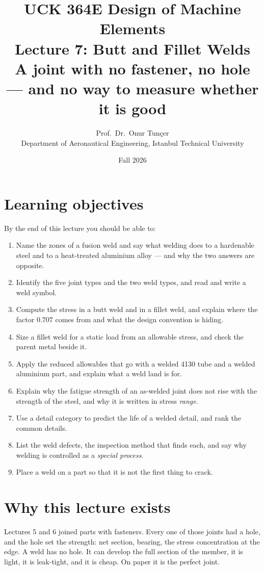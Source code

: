 \documentclass[11pt,a4paper]{article}
\title{\textbf{UCK 364E Design of Machine Elements}\\[4pt]
\Large Lecture 7: Butt and Fillet Welds\\[2pt]
\large A joint with no fastener, no hole --- and no way to measure whether it is good}
\author{Prof.\ Dr.\ Onur Tunçer\\ Department of Aeronautical Engineering, Istanbul Technical University}
\date{Fall 2026}
\begin{document}
\maketitle

\section*{Learning objectives}
By the end of this lecture you should be able to:
\begin{enumerate}[nosep]
  \item Name the zones of a fusion weld and say what welding does to a hardenable steel and to a
        heat-treated aluminium alloy --- and why the two answers are opposite.
  \item Identify the five joint types and the two weld types, and read and write a weld symbol.
  \item Compute the stress in a butt weld and in a fillet weld, and explain where the factor
        $0.707$ comes from and what the design convention is hiding.
  \item Size a fillet weld for a static load from an allowable stress, and check the parent metal
        beside it.
  \item Apply the reduced allowables that go with a welded 4130 tube and a welded aluminium part,
        and explain what a weld land is for.
  \item Explain why the fatigue strength of an as-welded joint does not rise with the strength of
        the steel, and why it is written in stress \emph{range}.
  \item Use a detail category to predict the life of a welded detail, and rank the common details.
  \item List the weld defects, the inspection method that finds each, and say why welding is
        controlled as a \emph{special process}.
  \item Place a weld on a part so that it is not the first thing to crack.
\end{enumerate}

\section{Why this lecture exists}

Lectures 5 and 6 joined parts with fasteners. Every one of those joints had a hole, and the hole
set the strength: net section, bearing, the stress concentration at the edge. A weld has no hole.
It can develop the full section of the member, it is light, it is leak-tight, and it is cheap.
On paper it is the perfect joint.
\end{document}
